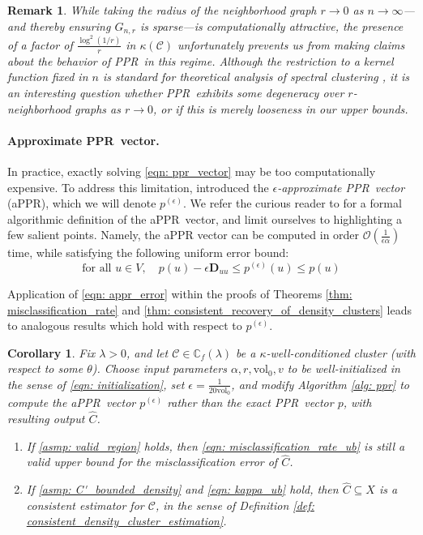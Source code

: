 \documentclass{article}
\newcommand{\vol}{\mathrm{vol}}
\newcommand{\1}{\mathbf{1}}
\newcommand{\pbf}{p}        %
\newcommand{\Xbf}{X}             %
\newcommand{\Dbf}{\mathbf{D}}
\newcommand{\Cbb}{\mathbb{C}}
\newcommand{\Cset}{\mathcal{C}}
\newcommand{\Cest}{\widehat{C}}
\newcommand{\pprspace}{{\sc PPR~}}
\theoremstyle{aldenthm}
\newtheorem{corollary}{Corollary}
\theoremstyle{aldenrmrk}
\newtheorem{remark}{Remark}
\begin{document}
\begin{remark}
	While taking the radius of the neighborhood graph $r \to 0$ as $n \to \infty$---and thereby ensuring $G_{n,r}$ is sparse---is computationally attractive, the presence of a factor of $\frac{\log^2(1/r)}{r}$ in $\kappa(\Cset)$ unfortunately prevents us from making claims about the behavior of \pprspace in this regime. Although the restriction to a kernel function fixed in $n$ is standard for theoretical analysis of spectral clustering \cite{schiebinger2015,vonluxburg2008}, it is an interesting question whether \pprspace exhibits some degeneracy over $r$-neighborhood graphs as $r \to 0$, or if this is merely looseness in our upper bounds.
\end{remark}

\paragraph{Approximate \pprspace vector.}

In practice, exactly solving \eqref{eqn: ppr_vector} may be too computationally expensive. To address this limitation, \citet{andersen2006} introduced the \emph{$\epsilon$-approximate \pprspace vector} (aPPR), which we will denote $\pbf^{(\epsilon)}$. We refer the curious reader to \cite{andersen2006} for a formal algorithmic definition of the a\pprspace vector, and limit ourselves to highlighting a few salient points. Namely, the aPPR vector can be computed in  order $\mathcal{O}\left(\frac{1}{\epsilon \alpha}\right)$ time, while satisfying the following uniform error bound:
\begin{equation}
\label{eqn: appr_error}
\textrm{for all $u \in V$}, \quad \pbf(u) - \epsilon \Dbf_{uu}\leq \pbf^{(\epsilon)}(u) \leq \pbf(u)
\end{equation}

Application of \eqref{eqn: appr_error} within the proofs of Theorems \ref{thm: misclassification_rate} and \ref{thm: consistent_recovery_of_density_clusters} leads to analogous results which hold with respect to $\pbf^{(\epsilon)}$.

\begin{corollary}
	\label{cor: appr}
	Fix $\lambda > 0$, and let $\Cset \in \Cbb_f(\lambda)$ be a $\kappa$-well-conditioned cluster (with respect to some $\theta$). Choose input parameters $\alpha, r, \vol_0, v$ to be well-initialized in the sense of \eqref{eqn: initialization}, set $\epsilon = \frac{1}{20 \vol_0}$, and modify Algorithm \ref{alg: ppr} to compute the a\pprspace vector $\pbf^{(\epsilon)}$ rather than the exact \pprspace vector $\pbf$, with resulting output $\Cest$.
	\begin{enumerate}
		\item If \ref{asmp: valid_region} holds, then \eqref{eqn: misclassification_rate_ub} is still a valid upper bound for the misclassification error of $\Cest$.
		\item If \ref{asmp: C'_bounded_density} and \eqref{eqn: kappa_ub} hold, 
		then $\Cest \subseteq \Xbf$ is a consistent estimator for $\Cset$, in the sense of Definition \ref{def: consistent_density_cluster_estimation}.
	\end{enumerate}
\end{corollary}
\end{document}
